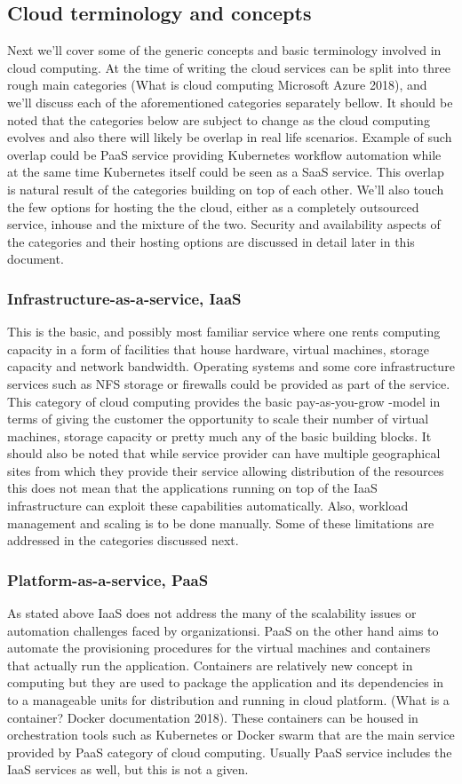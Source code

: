 \documentclass{article}
\begin{document}
\subsection{Cloud terminology and concepts}
Next we'll cover some of the generic concepts and basic terminology involved in cloud computing.
At the time of writing the cloud services can be split into three rough main categories (What is cloud computing Microsoft Azure 2018), and we'll discuss each of the aforementioned categories separately bellow. It should be noted that the categories below are subject to change as the cloud computing evolves and also there will likely be overlap in real life scenarios. Example of such overlap could be PaaS service providing Kubernetes workflow automation while at the same time Kubernetes itself could be seen as a SaaS service.
This overlap is natural result of the categories building on top of each other.
We'll also touch the few options for hosting the the cloud, either as a completely outsourced service, inhouse and the mixture of the two.
Security and availability aspects of the categories and their hosting options are discussed in detail later in this document. 
\subsubsection{Infrastructure-as-a-service, IaaS}
This is the basic, and possibly most familiar service where one rents computing capacity in a form of facilities that house hardware, virtual machines, storage capacity and network bandwidth.
Operating systems and some core infrastructure services such as NFS storage or firewalls could be provided as part of the service. This category of cloud computing provides the basic pay-as-you-grow -model in terms of giving the customer the opportunity to scale their number of virtual machines, storage capacity or pretty much any of the basic building blocks.
It should also be noted that while service provider can have multiple geographical sites from which they provide their service allowing distribution of the resources this does not mean that the applications running on top of the IaaS infrastructure can exploit these capabilities automatically.
Also, workload management and scaling is to be done manually. Some of these limitations are addressed in the categories discussed next.
\subsubsection{Platform-as-a-service, PaaS}
As stated above IaaS does not address the many of the scalability issues or automation challenges faced by organizationsi.
PaaS on the other hand aims to automate the provisioning procedures for the virtual machines and containers that actually run the application.
Containers are relatively new concept in computing but they are used to package the application and its dependencies in to a manageable units for distribution and running in cloud platform. (What is a container? Docker documentation 2018).
These containers can be housed in orchestration tools such as Kubernetes or Docker swarm that are the main service provided by PaaS category of cloud computing. 
Usually PaaS service includes the IaaS services as well, but this is not a given.
\end{document}
